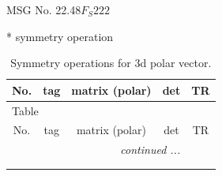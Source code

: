 \documentclass[fleqn,8pt]{jsarticle}
\begin{document}
\setcounter{MaxMatrixCols}{32}

\renewcommand{\tablename}{Table~}
\renewcommand{\figurename}{Figure~}
\begin{center}
\LARGE
MSG No. 22.48\quad$F_{S}222$
\end{center}
* symmetry operation
\renewcommand{\arraystretch}{1.3}
\begin{longtable}{ccccc}
\caption{Symmetry operations for 3d polar vector.}
 \\
 \hline \hline
No. & tag & matrix (polar) & det & TR \\ \hline \endfirsthead

\multicolumn{4}{l}{\tablename\ \thetable{}} \\
 \hline \hline
No. & tag & matrix (polar) & det & TR \\ \hline \endhead

 \hline \hline
\multicolumn{4}{r}{\footnotesize\it continued ...} \\ \endfoot

 \hline \hline
\multicolumn{4}{r}{} \\ \endlastfoot


\end{longtable}
\end{document}
